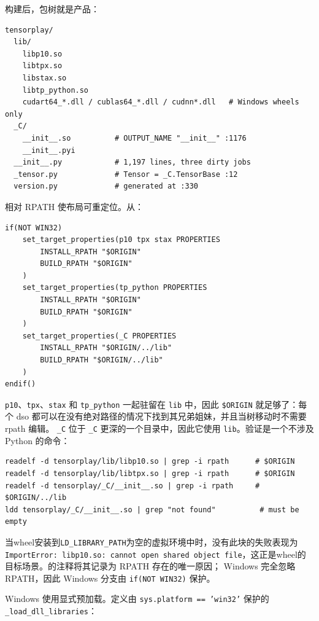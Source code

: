 构建后，包树就是产品：

\begin{lstlisting}[caption={Post-build layout under the package directory.}, label=lst:layout]
tensorplay/
  lib/
    libp10.so
    libtpx.so
    libstax.so
    libtp_python.so
    cudart64_*.dll / cublas64_*.dll / cudnn*.dll   # Windows wheels only
  _C/
    __init__.so          # OUTPUT_NAME "__init__" :1176
    __init__.pyi
  __init__.py            # 1,197 lines, three dirty jobs
  _tensor.py             # Tensor = _C.TensorBase :12
  version.py             # generated at :330
\end{lstlisting}

相对 RPATH 使布局可重定位。从：

\begin{lstlisting}[caption={RPATH is the loader contract.}, label=lst:rpath]
if(NOT WIN32)
    set_target_properties(p10 tpx stax PROPERTIES
        INSTALL_RPATH "$ORIGIN"
        BUILD_RPATH "$ORIGIN"
    )
    set_target_properties(tp_python PROPERTIES
        INSTALL_RPATH "$ORIGIN"
        BUILD_RPATH "$ORIGIN"
    )
    set_target_properties(_C PROPERTIES
        INSTALL_RPATH "$ORIGIN/../lib"
        BUILD_RPATH "$ORIGIN/../lib"
    )
endif()
\end{lstlisting}

\texttt{p10}、\texttt{tpx}、\texttt{stax} 和 \texttt{tp\_python} 一起驻留在 \texttt{lib} 中，因此 \texttt{\$ORIGIN} 就足够了：每个 \ac{dso} 都可以在没有绝对路径的情况下找到其兄弟姐妹，并且当树移动时不需要 \ac{rpath} 编辑。 \texttt{\_C} 位于 \texttt{\_C} 更深的一个目录中，因此它使用 \texttt{lib}。验证是一个不涉及 Python 的命令：

\begin{lstlisting}[caption={Linux loader verification without importing Python.}, label=lst:readelf]
readelf -d tensorplay/lib/libp10.so | grep -i rpath      # $ORIGIN
readelf -d tensorplay/lib/libtpx.so | grep -i rpath      # $ORIGIN
readelf -d tensorplay/_C/__init__.so | grep -i rpath     # $ORIGIN/../lib
ldd tensorplay/_C/__init__.so | grep "not found"          # must be empty
\end{lstlisting}

当wheel安装到\texttt{LD\_LIBRARY\_PATH}为空的虚拟环境中时，没有此块的失败表现为\texttt{ImportError: libp10.so: cannot open shared object file}，这正是wheel的目标场景。的注释将其记录为 RPATH 存在的唯一原因； Windows 完全忽略 RPATH，因此 Windows 分支由 \texttt{if(NOT WIN32)} 保护。

Windows 使用显式预加载。定义由 \texttt{sys.platform == 'win32'} 保护的 \texttt{\_load\_dll\_libraries}：

